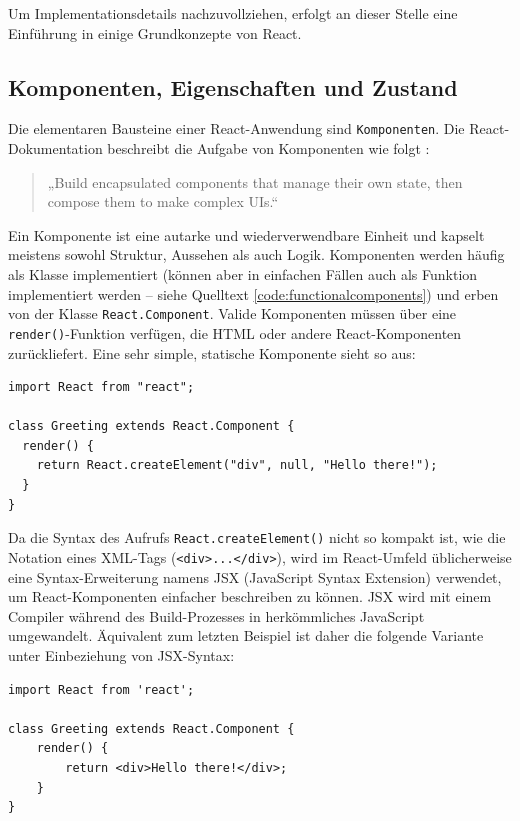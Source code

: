 Um Implementationsdetails nachzuvollziehen, erfolgt an dieser Stelle eine Einführung in einige Grundkonzepte von React.

\subsection{Komponenten, Eigenschaften und Zustand}
Die elementaren Bausteine einer React-Anwendung sind \texttt{Komponenten}. Die React-Dokumentation beschreibt die Aufgabe von Komponenten wie folgt \cite[Header-Sektion]{web:react}:
\begin{quote}
„Build encapsulated components that manage their own state, then compose them to make complex UIs.“
\end{quote}

Ein Komponente ist eine autarke und wiederverwendbare Einheit und kapselt meistens sowohl Struktur, Aussehen als auch Logik. Komponenten werden häufig als Klasse implementiert (können aber in einfachen Fällen auch als Funktion implementiert werden – siehe Quelltext \ref{code:functionalcomponents}) und erben von der Klasse \texttt{React.Component}. Valide Komponenten müssen über eine \texttt{render()}-Funktion verfügen, die HTML oder andere React-Komponenten zurückliefert. Eine sehr simple, statische Komponente sieht so aus:

\begin{minipage}{\linewidth}
\begin{lstlisting}[caption={Einfache React-Komponente ohne JSX-Syntax.}]
import React from "react";

class Greeting extends React.Component {
  render() {
    return React.createElement("div", null, "Hello there!");
  }
}
\end{lstlisting}
\end{minipage}

Da die Syntax des Aufrufs \texttt{React.createElement()} nicht so kompakt ist, wie die Notation eines XML-Tags (\texttt{<div>...</div>}), wird im React-Umfeld üblicherweise eine Syntax-Erweiterung namens JSX (JavaScript Syntax Extension) verwendet, um React-Komponenten einfacher beschreiben zu können. JSX wird mit einem Compiler während des Build-Prozesses in herkömmliches JavaScript umgewandelt. Äquivalent zum letzten Beispiel ist daher die folgende Variante unter Einbeziehung von JSX-Syntax:

\begin{minipage}{\linewidth}
\begin{lstlisting}[caption={Einfache React-Komponente mit JSX-Syntax.}]
import React from 'react';

class Greeting extends React.Component {
    render() {
        return <div>Hello there!</div>;
    }
}
\end{lstlisting}
\end{minipage}

